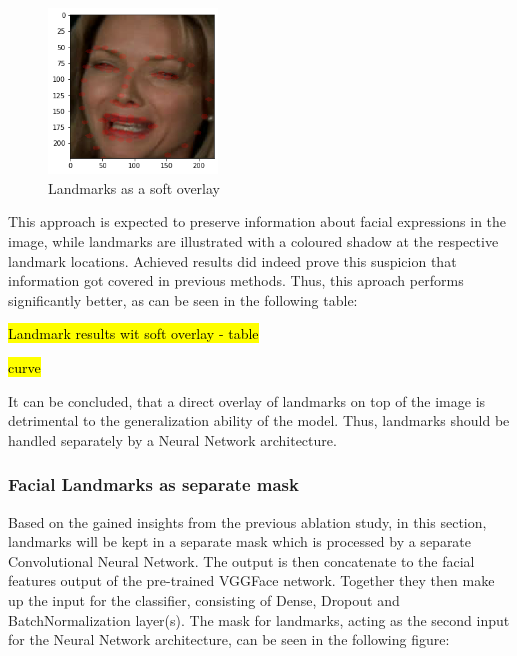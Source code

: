 \begin{figure}[H]
  \begin{center}
  \includegraphics[angle=0, width=0.4\textwidth]{Figures/landmarks_as_softOverlay.png}
  \caption{Landmarks as a soft overlay}
  \label{fig:LandmarksSoftOverlay}
  \end{center}
\end{figure}

This approach is expected to preserve information about facial expressions in the image, while landmarks are illustrated with a coloured shadow at the respective landmark locations. Achieved results did indeed prove this suspicion that information got covered in previous methods. Thus, this aproach performs significantly better, as can be seen in the following table:

\hl{Landmark results wit soft overlay - table}

\hl{curve}

It can be concluded, that a direct overlay of landmarks on top of the image is detrimental to the generalization ability of the model. Thus, landmarks should be handled separately by a Neural Network architecture.

\subsubsection{Facial Landmarks as separate mask}
Based on the gained insights from the previous ablation study, in this section, landmarks will be kept in a separate mask which is processed by a separate Convolutional Neural Network. The output is then concatenate to the facial features output of the pre-trained VGGFace network. Together they then make up the input for the classifier, consisting of Dense, Dropout and BatchNormalization layer(s).
\newline\newline
The mask for landmarks, acting as the second input for the Neural Network architecture, can be seen in the following figure:

